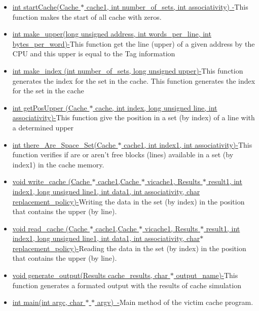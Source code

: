 \documentclass[12pt]{article}
\begin{document}
\setlength{\parskip}{0.0pt}
\begin{itemize}
	\item \uline{int startCache(Cache $\ast$ cache1, int number\_of\_sets, int associativity) -}This function makes the start of all cache with zeros.\par

	\item \uline{int make\_upper(long unsigned address, int words\_per\_line, int bytes\_per\_word)-}This function get the line (upper) of a given address by the CPU and this upper is equal to the Tag information\par

	\item \uline{int make\_index (int number\_of\_sets, long unsigned upper)-}This function generates the index for the set in the cache. This function generates the index for the set in the cache\par

	\item \uline{int getPosUpper (Cache $\ast$ cache, int index, long unsigned line, int associativity)-}This function give the position in a set (by index) of a line with a determined upper\par

	\item \uline{int there\_Are\_Space\_Set(Cache $\ast$ cache1, int index1, int associativity)-}This function verifies if are or aren't free blocks (lines) available in a set (by index1) in the cache memory.\par

	\item \uline{void write\_cache (Cache $\ast$ cache1,Cache $\ast$ vicache1, Results $\ast$ result1, int index1, long unsigned line1, int data1, int associativity, char replacement\_policy)-}Writing the data in the set (by index) in the position that contains the upper (by line).\par

	\item \uline{void read\_cache (Cache $\ast$ cache1,Cache $\ast$ vicache1, Results $\ast$ result1, int index1, long unsigned line1, int data1, int associativity, char$\ast$  replacement\_policy)-}Reading the data in the set (by index) in the position that contains the upper (by line).\par

	\item \uline{void generate\_output(Results cache\_results, char $\ast$ output\_name)-}This function generates a formated output with the results of cache simulation\par

	\item \uline{int main(int argc, char $\ast$ $\ast$ argv)\  -}Main method of the victim cache program. 
\end{itemize}\par
\end{document}
